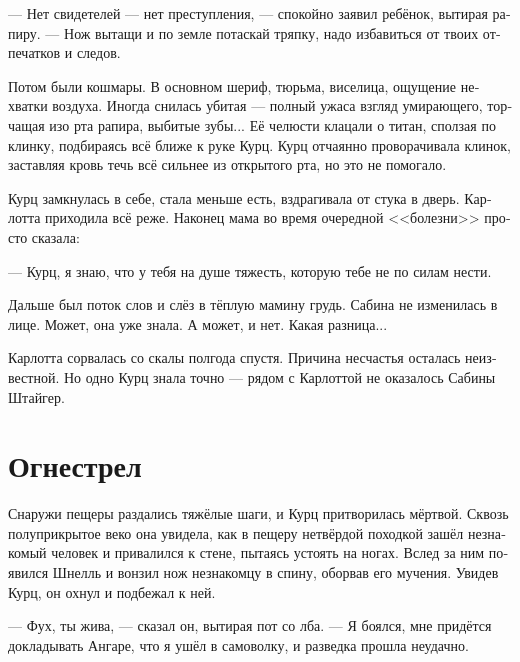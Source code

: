 \documentclass[a4paper,12pt,fleqn]{book}\usepackage{polyglossia}\setdefaultlanguage[babelshorthands=true]{russian}\setotherlanguage{english}\defaultfontfeatures{Ligatures=TeX,Mapping=tex-text}\usepackage{xcolor}\newcommand{\ml}[3]{#2}
\begin{document}
\ml{$0$}
{--- Нет свидетелей --- нет преступления, --- спокойно заявил ребёнок, вытирая рапиру.}
{``No witness, no crime,'' the baby calmly answered wiping her rapier.}
\ml{$0$}
{--- Нож вытащи и по земле потаскай тряпку, надо избавиться от твоих отпечатков и следов.}
{``Take out the knife and drag a rag on the ground, we should wipe out your fingerprints and footsteps.''}

\ml{$0$}
{Потом были кошмары.}
{Then came nightmares.}
\ml{$0$}
{В основном шериф, тюрьма, виселица, ощущение нехватки воздуха.}
{Mostly the Scherif, a prison, a gallows, suffocation.}
\ml{$0$}
{Иногда снилась убитая --- полный ужаса взгляд умирающего, торчащая изо рта рапира, выбитые зубы...}
{Sometimes the murdered woman: a gaze, full of the fear of death, a rapier in her mouth, broken teeth ...}
Её челюсти клацали о титан, сползая по клинку, подбираясь всё ближе к руке Курц.
Курц отчаянно проворачивала клинок, заставляя кровь течь всё сильнее из открытого рта, но это не помогало.

Курц замкнулась в себе, стала меньше есть, вздрагивала от стука в дверь.
Карлотта приходила всё реже.
Наконец мама во время очередной <<болезни>> просто сказала:

--- Курц, я знаю, что у тебя на душе тяжесть, которую тебе не по силам нести.

Дальше был поток слов и слёз в тёплую мамину грудь.
\ml{$0$}
{Сабина не изменилась в лице.}
{Sabina's face hadn't changed.}
\ml{$0$}
{Может, она уже знала.}
{Maybe she already knew.}
\ml{$0$}
{А может, и нет.}
{Maybe not.}
\ml{$0$}
{Какая разница...}
{Who cares ...}

Карлотта сорвалась со скалы полгода спустя.
Причина несчастья осталась неизвестной.
Но одно Курц знала точно --- рядом с Карлоттой не оказалось Сабины Штайгер.

\section{Огнестрел}

Снаружи пещеры раздались тяжёлые шаги, и Курц притворилась мёртвой.
Сквозь полуприкрытое веко она увидела, как в пещеру нетвёрдой походкой зашёл незнакомый человек и привалился к стене, пытаясь устоять на ногах.
Вслед за ним появился Шнелль и вонзил нож незнакомцу в спину, оборвав его мучения.
Увидев Курц, он охнул и подбежал к ней.

--- Фух, ты жива, --- сказал он, вытирая пот со лба.
--- Я боялся, мне придётся докладывать Ангаре, что я ушёл в самоволку, и разведка прошла неудачно.
\end{document}
